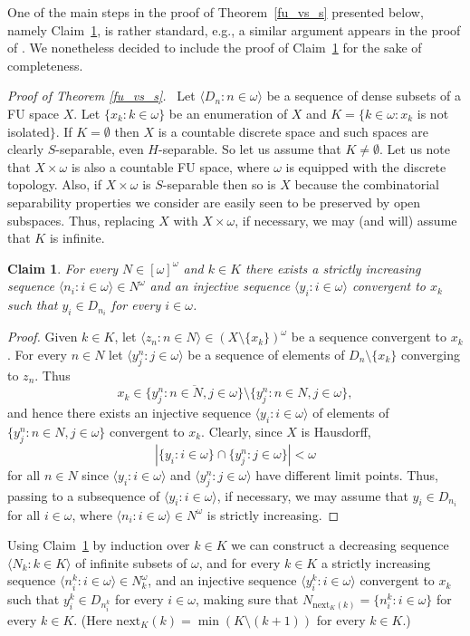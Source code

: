 \documentclass[12pt,a4paper]{amsart}
\newtheorem{claim}[theorem]{Claim}
\theoremstyle{definition}
\newcommand{\w}{\omega}
\newcommand{\la}{\langle}
\newcommand{\ra}{\rangle}
\begin{document}


One of the main steps in the proof of Theorem~\ref{fu_vs_s} presented below, namely Claim~\ref{cl_0001}, is rather standard, e.g., a similar argument appears in the proof of \cite[Proposition~4.1]{GruSak11}. We nonetheless decided 
to include the proof  of Claim~\ref{cl_0001} for the sake of completeness. 
\medskip

\noindent\textit{Proof of Theorem \ref{fu_vs_s}.} \ 
Let $\la D_n:n\in\w\ra$ be a sequence of dense subsets of a FU space $X$.
Let $\{x_k:k\in\w\}$ be an enumeration of $X$ and 
 $K=\{k\in\w:x_k$ is not isolated$\}$. 
If $K=\emptyset$ then $X$ is a countable discrete space and such spaces
are clearly $S$-separable, even $H$-separable.
So let us assume that $K\neq\emptyset$.
Let us note that $X\times \w$ is also a countable FU space, where 
$\w$ is equipped with the discrete topology. Also, if
$X\times \w$ is $S$-separable then so is $X$ because the combinatorial separability properties we consider are easily seen to be preserved by 
open subspaces. Thus, replacing $X$ with $X\times\w$, if necessary,
we may (and will) assume that $K$ is infinite.
 
 \begin{claim} \label{cl_0001}
For every $N\in [\w]^\w$ and $k\in K$ there exists
a strictly increasing sequence $\la n_i:i\in\w\ra\in N^\w$
and an injective sequence
$\la y_i:i\in\w \ra$ convergent to $x_k$
such that $y_i \in D_{n_i}$ 
 for every $i\in\w$.
 \end{claim}
 \begin{proof}
Given $k\in K$,
let $\la z_n:n\in N\ra \in (X\setminus\{x_k\})^\w$ be a sequence 
convergent to $x_k$.
For every  $n\in N$  let $\la y^{n}_{j}:j\in\w\ra$ be a sequence 
of elements of $D_n\setminus\{x_k\} $ converging to $z_n$.
Thus  
$$ x_k\in\overline{\{y^{n}_j:n\in N,j\in\w\}}\setminus \{y^{n}_j:n\in N,j\in\w\},$$ 
and hence there exists an injective sequence $\la y_i:i\in\w\ra$ of elements
of $\{y^{n}_j:n\in N,j\in\w\}$ convergent to $x_k$. 
Clearly, {since $X$ is Hausdorff,}
$$|\{y_i:i\in\w\}\cap\{y^n_j:j\in\w\}|<\w$$
for all $n\in N$ since $\la y_i:i\in\w\ra$ and $\la y^n_j:j\in\w\ra$
have different limit points. Thus, passing to a subsequence
of $\la y_i:i\in\w\ra$, if necessary, we may assume that
$y_i\in D_{n_i}$ for all $i\in\w$, where  $\la n_i:i\in\w\ra\in N^\w$
is strictly increasing.
 \end{proof}
 Using Claim~\ref{cl_0001} by induction  over $k\in K$ we can construct a decreasing sequence
 $\la N_k :k\in K\ra$ of infinite subsets of $\w$, and for every
 $k\in K$ 
a strictly increasing sequence $\la n^k_i:i\in\w\ra\in N_k^\w$,
and an injective sequence
$\la y^k_i:i\in\w \ra$ convergent to $x_k$
such that $y^k_i \in D_{n^k_i}$ 
 for every $i\in\w$, making sure that 
 $N_{\mathrm{next}_K(k)} =\{n^k_i:i\in\w\}$
 for every $k\in K$. (Here $\mathrm{next}_K(k)=\min(K\setminus (k+1))$
 for every $k\in K$.)
 
\end{document}

